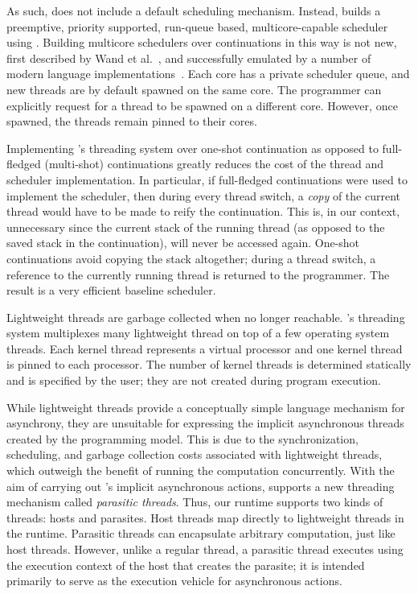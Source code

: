 As such,  does not include a default scheduling mechanism.
Instead, \MM builds a preemptive, priority supported, run-queue based,
multicore-capable scheduler using . Building multicore
schedulers over continuations in this way is not new, first described by Wand
et al.~\cite{ContMP}, and successfully emulated by a number of modern language
implementations~\cite{ghc,Auhagen11}. Each core has a private scheduler queue,
and new threads are by default spawned on the same core. The programmer can
explicitly request for a thread to be spawned on a different core. However,
once spawned, the threads remain pinned to their cores.

Implementing \MM's threading system over one-shot continuation as opposed to
full-fledged (multi-shot) continuations greatly reduces the cost of the thread
and scheduler implementation. In particular, if full-fledged continuations were
used to implement the scheduler, then during every thread switch, a
\emph{copy} of the current thread would have to be made to reify the
continuation. This is, in our context, unnecessary since the current stack of
the running thread (as opposed to the saved stack in the continuation), will
never be accessed again.  One-shot continuations avoid
copying the stack altogether; during a thread switch, a reference to the
currently running thread is returned to the programmer. The result is a very
efficient baseline scheduler.

Lightweight threads are garbage collected when no longer reachable. \MM's
threading system multiplexes many lightweight thread on top of a few operating
system threads. Each kernel thread represents a virtual processor and one
kernel thread is pinned to each processor. The number of kernel threads is
determined statically and is specified by the user; they are not created during
program execution.

While lightweight threads provide a conceptually simple language mechanism for
asynchrony, they are unsuitable for expressing the implicit asynchronous
threads created by the \acml programming model. This is due to the
synchronization, scheduling, and garbage collection costs associated with
lightweight threads, which outweigh the benefit of running the computation
concurrently. With the aim of carrying out \acml's implicit asynchronous
actions, \MM supports a new threading mechanism called \emph{parasitic
threads}. Thus, our runtime supports two kinds of threads: hosts and parasites.
Host threads map directly to lightweight threads in the runtime. Parasitic
threads can encapsulate arbitrary computation, just like host threads. However,
unlike a regular thread, a parasitic thread executes using the execution
context of the host that creates the parasite; it is intended primarily to
serve as the execution vehicle for asynchronous actions.

